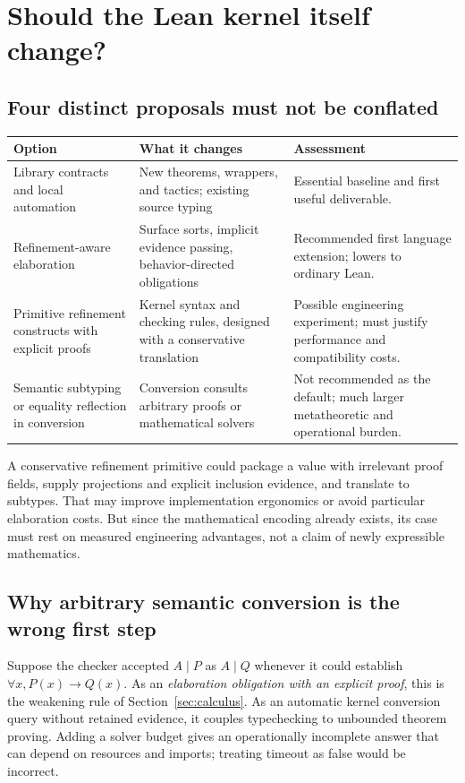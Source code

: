 \documentclass[11pt,letterpaper]{article}
\theoremstyle{definition}
\theoremstyle{remark}
\begin{document}
\section{Should the Lean kernel itself change?}\label{sec:kernel}

\subsection{Four distinct proposals must not be conflated}
\begin{center}\small
\begin{tabularx}{\textwidth}{@{}P{1.35in}YY@{}}
\toprule
Option & What it changes & Assessment\\
\midrule
Library contracts and local automation & New theorems, wrappers, and tactics; existing source typing & Essential baseline and first useful deliverable.\\
Refinement-aware elaboration & Surface sorts, implicit evidence passing, behavior-directed obligations & Recommended first language extension; lowers to ordinary Lean.\\
Primitive refinement constructs with explicit proofs & Kernel syntax and checking rules, designed with a conservative translation & Possible engineering experiment; must justify performance and compatibility costs.\\
Semantic subtyping or equality reflection in conversion & Conversion consults arbitrary proofs or mathematical solvers & Not recommended as the default; much larger metatheoretic and operational burden.\\
\bottomrule
\end{tabularx}
\end{center}

A conservative refinement primitive could package a value with irrelevant
proof fields, supply projections and explicit inclusion evidence, and translate
to subtypes. That may improve implementation ergonomics or avoid particular
elaboration costs. But since the mathematical encoding already exists, its case
must rest on measured engineering advantages, not a claim of newly expressible
mathematics.

\subsection{Why arbitrary semantic conversion is the wrong first step}
Suppose the checker accepted $A\mid P$ as $A\mid Q$ whenever it could establish
$\forall x,P(x)\to Q(x)$. As an \emph{elaboration obligation with an explicit
proof}, this is the weakening rule of Section~\ref{sec:calculus}. As an automatic
kernel conversion query without retained evidence, it couples typechecking to
unbounded theorem proving. Adding a solver budget gives an operationally
incomplete answer that can depend on resources and imports; treating timeout
as false would be incorrect.
\end{document}
